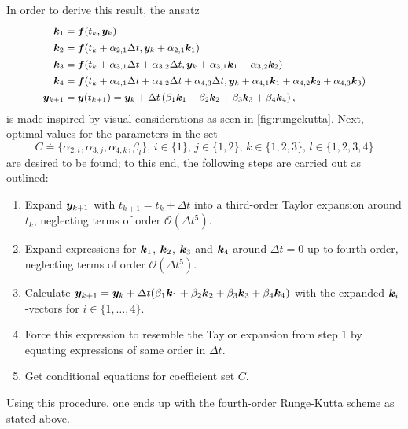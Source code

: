 \documentclass[a4paper,11pt]{report}
\begin{document}
In order to derive this result, the ansatz
\begin{align}\small
\begin{aligned}
\bm{k}_1 &= \bm{f}(t_k,\bm{y}_k) \\
\bm{k}_2 &= \bm{f}(t_k+\alpha_{2,1}\Delta t,\bm{y}_k+\alpha_{2,1}\bm{k}_1) \\
\bm{k}_3 &= \bm{f}(t_k + \alpha_{3,1}\Delta t + \alpha_{3,2}\Delta t,\bm{y}_k+\alpha_{3,1}\bm{k}_1 + \alpha_{3,2}\bm{k}_2) \\
\bm{k}_4 &= \bm{f}(t_k+\alpha_{4,1}\Delta t + \alpha_{4,2}\Delta t + \alpha_{4,3}\Delta t,\bm{y}_k+\alpha_{4,1}\bm{k}_1 + \alpha_{4,2}\bm{k}_2 + \alpha_{4,3}\bm{k}_3) \\
\bm{y}_{k+1} &= \bm{y}(t_{k+1}) = \bm{y}_k + \Delta t \left(\beta_1 \bm{k}_1 + \beta_2\bm{k}_2 + \beta_3\bm{k}_3 + \beta_4\bm{k}_4\right),
\end{aligned}
\end{align}
is made inspired by visual considerations as seen in \cref{fig:rungekutta}. Next, optimal values for the parameters in the set \begin{equation} C \doteq \{\alpha_{2,i}, \alpha_{3,j}, \alpha_{4,k}, \beta_l\}, \, i \in \{1\},\,j \in \{1,2\},\,k \in \{1,2,3\},\, l \in \{1,2,3,4\}
\end{equation} are desired to be found; to this end, the following steps are carried out as outlined:
\begin{enumerate}
\item Expand $\bm{y}_{k+1}$ with $t_{k+1} = t_k +\Delta t$ into a third-order Taylor expansion around $t_k$, neglecting terms of order $\mathcal{O}(\Delta t^5)$.
\item Expand expressions for $\bm{k}_1$, $\bm{k}_2$, $\bm{k}_3$ and $\bm{k}_4$ around $\Delta t=0$ up to fourth order, neglecting terms of order $\mathcal{O}(\Delta t^5)$.
\item Calculate $\bm{y}_{k+1} = \bm{y}_k + \Delta t(\beta_1\bm{k}_1 + \beta_2\bm{k}_2 + \beta_3\bm{k}_3 + \beta_4\bm{k}_4)$ with the expanded $\bm{k}_i$-vectors for $i \in \{1,\dots,4\}$.
\item Force this expression to resemble the Taylor expansion from step 1 by equating expressions of same order in $\Delta t$.
\item Get conditional equations for coefficient set $C$.
\end{enumerate}
Using this procedure, one ends up with the fourth-order Runge-Kutta scheme as stated above.


%
%
\end{document}
